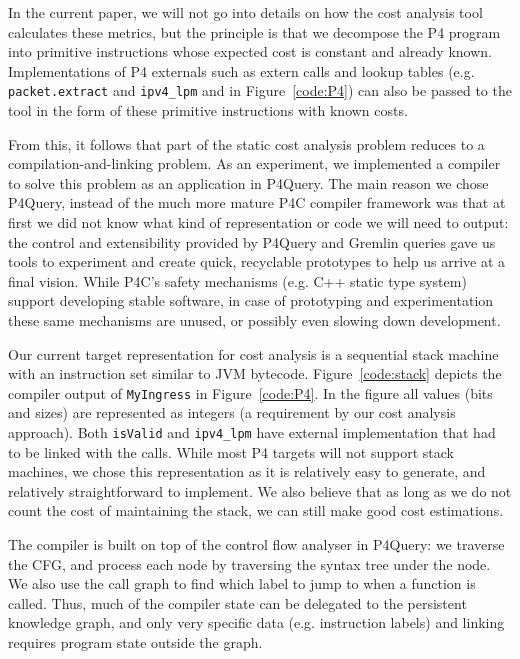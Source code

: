 \documentclass[sigconf]{acmart}
\begin{document}
  In the current paper, we will not go into details on how the cost analysis tool calculates these metrics, but the principle is that we decompose the P4 program into primitive instructions whose expected cost is constant and already known. Implementations of P4 externals such as extern calls and lookup tables (e.g. \texttt{packet.extract} and \texttt{ipv4\_lpm} and in Figure~\ref{code:P4}) can also be passed to the tool in the form of these primitive instructions with known costs. 

  From this, it follows that part of the static cost analysis problem reduces to a compilation-and-linking problem. As an experiment, we implemented a compiler to solve this problem as an application in P4Query. The main reason we chose P4Query, instead of the much more mature P4C compiler framework was that at first we did not know what kind of representation or code we will need to output: the control and extensibility provided by P4Query and Gremlin queries gave us tools to experiment and create quick, recyclable prototypes to help us arrive at a final vision. While P4C's safety mechanisms (e.g. C++ static type system) support developing stable software, in case of prototyping and experimentation these same mechanisms are unused, or possibly even slowing down development.

  Our current target representation for cost analysis is a sequential stack machine with an instruction set similar to JVM bytecode. Figure~\ref{code:stack} depicts the compiler output of \texttt{MyIngress} in Figure~\ref{code:P4}. In the figure all values (bits and sizes) are represented as integers (a requirement by our cost analysis approach). Both \texttt{isValid} and \texttt{ipv4\_lpm} have external implementation that had to be linked with the calls. While most P4 targets will not support stack machines, we chose this representation as it is relatively easy to generate, and relatively straightforward to implement. We also believe that as long as we do not count the cost of maintaining the stack, we can still make good cost estimations.
  
  The compiler is built on top of the control flow analyser in P4Query: we traverse the CFG, and process each node by traversing the syntax tree under the node. We also use the call graph to find which label to jump to when a function is called. Thus, much of the compiler state can be delegated to the persistent knowledge graph, and only very specific data (e.g. instruction labels) and linking requires program state outside the graph.  
\end{document}
